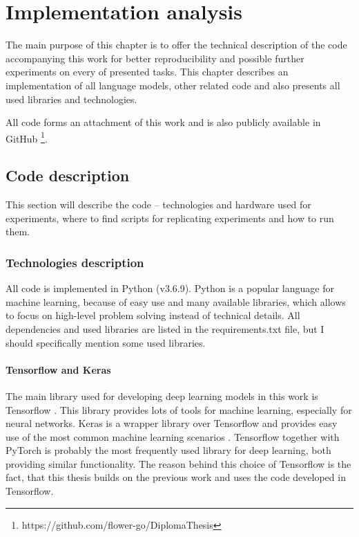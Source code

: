 \chapter{Implementation analysis}
\label{chap:impl}
The main purpose of this chapter is to offer the technical description of the code accompanying this work for better reproducibility and possible further experiments on every of presented tasks. This chapter describes an implementation of all language models, other related code and also presents all used libraries and technologies.
\par
All code forms an attachment of this work and is also publicly available in GitHub \footnote{https://github.com/flower-go/DiplomaThesis}.

\section{Code description}
This section will describe the code -- technologies and hardware used for experiments, where to find scripts for replicating experiments and how to run them.
\subsection{Technologies description}
All code is implemented in Python (v3.6.9). Python is a popular language for machine learning, because of easy use and many available libraries, which allows to focus on high-level problem solving instead of technical details. All dependencies and used libraries are listed in the requirements.txt file, but I should specifically mention some used libraries. 
\subsubsection{Tensorflow and Keras}
The main library used for developing deep learning models in this work is Tensorflow \citep{tensorflow2015-whitepaper}. This library provides lots of tools for machine learning, especially for neural networks. Keras is a wrapper library over Tensorflow and provides easy use of the most common machine learning scenarios \citep{keras}. Tensorflow together with PyTorch \citep{NEURIPS2019_9015} is probably the most frequently used library for deep learning, both providing similar functionality. The reason behind this choice of Tensorflow is the fact, that this thesis builds on the previous work and uses the code developed in Tensorflow.
